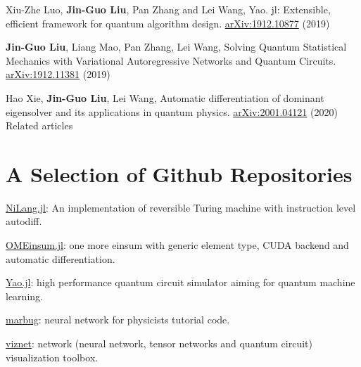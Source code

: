\documentclass[letterpaper]{article}
\renewenvironment{itemize}{
  \begin{list}{}{
    \setlength{\leftmargin}{1.5em}
  }
}{
  \end{list}
}
\begin{document}
\begin{itemize}
    \item [10] Xiu-Zhe Luo, {\bf Jin-Guo Liu}, Pan Zhang and Lei Wang, Yao. jl: Extensible, efficient framework for quantum algorithm design. \href{https://arxiv.org/abs/1912.10877}{arXiv:1912.10877} (2019)
    \item [11] {\bf Jin-Guo Liu}, Liang Mao, Pan Zhang, Lei Wang, Solving Quantum Statistical Mechanics with Variational Autoregressive Networks and Quantum Circuits. \href{https://arxiv.org/abs/1912.11381}{arXiv:1912.11381} (2019)
    \item [12] Hao Xie, {\bf Jin-Guo Liu}, Lei Wang, Automatic differentiation of dominant eigensolver and its applications in quantum physics. \href{https://arxiv.org/abs/2001.04121}{arXiv:2001.04121} (2020)
Related articles
\end{itemize}

\section*{A Selection of Github Repositories}
\begin{itemize}
    \item \href{https://github.com/GiggleLiu/NiLang.jl}{NiLang.jl}: An implementation of reversible Turing machine with instruction level autodiff.
    \item \href{https://github.com/under-Peter/OMEinsum.jl}{OMEinsum.jl}: one more einsum with generic element type, CUDA backend and automatic differentiation.
    \item \href{https://github.com/QuantumBFS/Yao.jl}{Yao.jl}: high performance quantum circuit simulator aiming for quantum machine learning.
    \item \href{https://github.com/GiggleLiu/marburg}{marbug}: neural network for physicists tutorial code.
    \item \href{https://github.com/GiggleLiu/viznet}{viznet}: network (neural network, tensor networks and quantum circuit) visualization toolbox.
\end{itemize}
\end{document}

